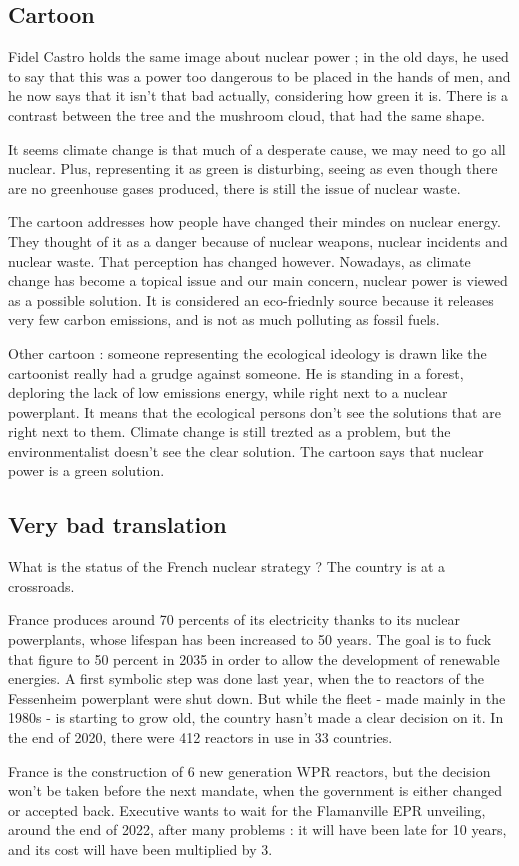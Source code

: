 \documentclass[a4paper,12pt]{book}
\begin{document}
\subsection{Cartoon}
Fidel Castro holds the same image about nuclear power ; in the old days, he used to say that this was a power too dangerous to be placed in the hands of men, and he now says that it isn't that bad actually, considering how green it is. There is a contrast between the tree and the mushroom cloud, that had the same shape.
\par It seems climate change is that much of a desperate cause, we may need to go all nuclear. Plus, representing it as green is disturbing, seeing as even though there are no greenhouse gases produced, there is still the issue of nuclear waste.
\par The cartoon addresses how people have changed their mindes on nuclear energy. They thought of it as a danger because of nuclear weapons, nuclear incidents and nuclear waste. That perception has changed however. Nowadays, as climate change has become a topical issue and our main concern, nuclear power is viewed as a possible solution. It is considered an eco-friednly source because it releases very few carbon emissions, and is not as much polluting as fossil fuels.
\par Other cartoon : someone representing the ecological ideology is drawn like the cartoonist really had a grudge against someone. He is standing in a forest, deploring the lack of low emissions energy, while right next to a nuclear powerplant. It means that the ecological persons don't see the solutions that are right next to them. Climate change is still trezted as a problem, but the environmentalist doesn't see the clear solution. The cartoon says that nuclear power is a green solution.

\subsection{Very bad translation}
What is the status of the French nuclear strategy ? The country is at a crossroads.
\par France produces around 70 percents of its electricity thanks to its nuclear powerplants, whose lifespan has been increased to 50 years. The goal is to fuck that figure to 50 percent in 2035 in order to allow the development of renewable energies. A first symbolic step was done last year, when the to reactors of the Fessenheim powerplant were shut down. But while the fleet - made mainly in the 1980s - is starting to grow old, the country hasn't made a clear decision on it. In the end of 2020, there were 412 reactors in use in 33 countries.
\par France is the construction of 6 new generation WPR reactors, but the decision won't be taken before the next mandate, when the government is either changed or accepted back. Executive wants to wait for the Flamanville EPR unveiling, around the end of 2022, after many problems : it will have been late for 10 years, and its cost will have been multiplied by 3.    
\end{document}
